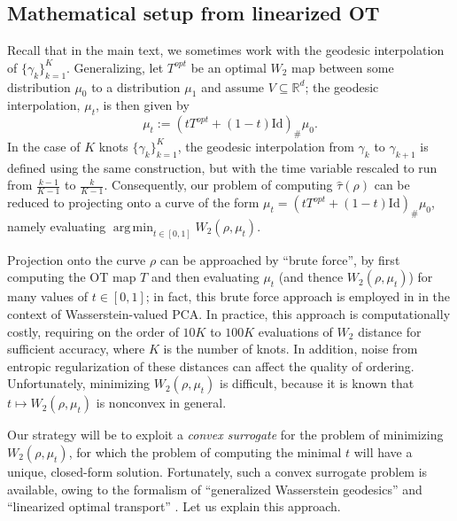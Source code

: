 \documentclass[aos, preprint]{imsart}
\theoremstyle{plain}
\theoremstyle{remark}
\DeclareMathOperator*{\argmin}{arg\,min}
\begin{document}
\begin{appendix}
\subsection*{Mathematical setup from linearized OT}
Recall that in the main text, we sometimes work with the geodesic
interpolation of $\{\gamma_{k}\}_{k=1}^{K}$. Generalizing, let $T^{opt}$
be an optimal $W_{2}$ map between some distribution $\mu_{0}$ to a distribution $\mu_{1}$ and assume
$V\subseteq\mathbb{R}^{d}$; the geodesic interpolation, $\mu_t$, is then given
by
\[
\mu_{t}:=(tT^{opt}+(1-t)\text{Id})_{\#}\mu_{0}.
\]
In the case of $K$ knots $\{\gamma_{k}\}_{k=1}^{K}$, the geodesic
interpolation from $\gamma_{k}$ to $\gamma_{k+1}$ is defined using
the same construction, but with the time variable rescaled to run
from $\frac{k-1}{K-1}$ to $\frac{k}{K-1}$. Consequently, our problem
of computing $\hat{\tau}(\rho)$ can be reduced to projecting onto
a curve of the form $\mu_{t}=(tT^{opt}+(1-t)\text{Id})_{\#}\mu_{0}$,
namely evaluating $\argmin_{t\in[0,1]}W_{2}(\rho,\mu_{t})$.

Projection onto the curve $\rho$ can be approached by ``brute force'', by
first computing the OT map $T$ and then evaluating $\mu_{t}$ (and
thence $W_{2}(\rho,\mu_{t})$) for many values of $t\in[0,1]$; in
fact, this brute force approach is employed in \cite{seguy2015principal}
in the context of Wasserstein-valued PCA. In practice, this approach is computationally costly, requiring on the order of $10 K$ to $100 K$ evaluations of $W_2$ distance for sufficient accuracy, where $K$ is the number of knots. In addition, noise from entropic regularization of these distances can affect the quality of ordering. Unfortunately, minimizing
$W_{2}(\rho,\mu_{t})$ is difficult, because it is known \cite[Example 9.1.5]{ambrosio2008gradient}  that $t\mapsto W_{2}(\rho,\mu_{t})$ is nonconvex in general.

Our strategy will be to exploit a \emph{convex surrogate}
for the problem of minimizing $W_{2}(\rho,\mu_{t})$, for which the
problem of computing the minimal $t$ will have a unique, closed-form
solution. Fortunately, such a convex surrogate problem is available,
owing to the formalism of ``generalized Wasserstein geodesics''
and ``linearized optimal transport''  \cite{ambrosio2008gradient, bai2023linear, moosmuller2023linear, wang2013linear}. Let us explain
this approach.


\end{appendix}
\end{document}
